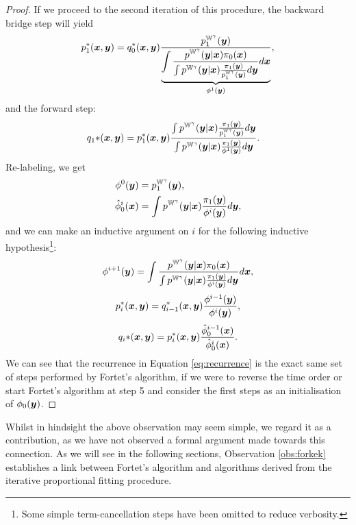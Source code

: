 \documentclass[a4paper,12pt,twoside,openright]{report}
\theoremstyle{definition}
\begin{document}
\begin{proof}
If we proceed to the second iteration of this procedure, the backward bridge step will yield
\begin{align}
    p_1^{*} ({\bm{x}}, {\bm{y}}) =  q_0^{*} ({\bm{x}}, {\bm{y}}) \frac{p^{\mathbb{W}^{\gamma}}_1({\bm{y}})}{ \underbrace{\displaystyle\int \frac{p^{\mathbb{W}^{\gamma}}({\bm{y}}| {\bm{x}})\pi_0({\bm{x}})}{\int p^{\mathbb{W}^{\gamma}}({\bm{y}}| {\bm{x}}) \frac{\pi_1({\bm{y}})}{p^{\mathbb{W}^{\gamma}}_1({\bm{y}})} d{\bm{y}}}d{\bm{x}}}_{{\phi}^{1}({\bm{y}})}} ,
\end{align}
and the forward step:
\begin{align}
    q_1{*} ({\bm{x}}, {\bm{y}}) &= p_1^{*} ({\bm{x}}, {\bm{y}}) \frac{\int    p^{\mathbb{W}^{\gamma}}({\bm{y}}| {\bm{x}}) \frac{\pi_1({\bm{y}})}{p^{\mathbb{W}^{\gamma}}_1({\bm{y}})}  d {\bm{y}}}{\int    p^{\mathbb{W}^{\gamma}}({\bm{y}}| {\bm{x}}) \frac{\pi_1({\bm{y}})}{{\phi}^{1}({\bm{y}})}  d {\bm{y}}}.
\end{align}
Re-labeling, we get 
\begin{align}
    \phi^0({\bm{y}})&=p^{\mathbb{W}^{\gamma}}_1({\bm{y}}), \\ 
    \hat{\phi}_0^{i}({\bm{x}}) &= \int  p^{\mathbb{W}^{\gamma}}({\bm{y}}| {\bm{x}}) \frac{\pi_1({\bm{y}})}{{\phi}^{i}({\bm{y}})}  d {\bm{y}},
\end{align}
and we can make an inductive argument on $i$ for the following inductive hypothesis\footnote{Some simple term-cancellation steps have been omitted to reduce verbosity.}:
\begin{align} \label{eq:recurrence}
  {\phi}^{i+1}({\bm{y}}) =  \displaystyle\int \frac{p^{\mathbb{W}^{\gamma}}({\bm{y}}| {\bm{x}})\pi_0({\bm{x}})}{\int p^{\mathbb{W}^{\gamma}}({\bm{y}}| {\bm{x}}) \frac{\pi_1({\bm{y}})}{\phi^i({\bm{y}})} d{\bm{y}}}d{\bm{x}},
 \end{align}
 \begin{align}
  p_i^{*} ({\bm{x}}, {\bm{y}}) =   q_{i-1}^{*} ({\bm{x}}, {\bm{y}}) \frac{\phi^{i-1}({\bm{y}})}{{\phi}^{i}({\bm{y}})} ,
\end{align}
 \begin{align}
      q_i{*} ({\bm{x}}, {\bm{y}}) =     p_i^{*} ({\bm{x}}, {\bm{y}}) \frac{\hat{\phi}_0^{i-1}({\bm{x}})}{\hat{\phi}_0^{i}({\bm{x}})} .
\end{align}
We can see that the  recurrence in Equation \ref{eq:recurrence} is the exact same set of steps performed by Fortet's algorithm, if we were to reverse the time order or start Fortet's algorithm at step 5 and consider the first steps  as an initialisation of $\phi_0({\bm{y}})$.
\end{proof}

Whilst in hindsight the above observation may seem simple, we regard it as a contribution, as we have not observed a formal argument made towards this connection. As we will see in the following sections, Observation \ref{obs:forkek} establishes a link between Fortet's algorithm and algorithms derived from the iterative proportional fitting procedure.
\end{document}
